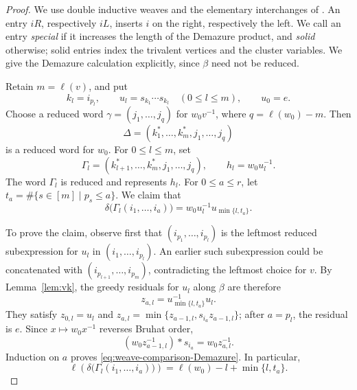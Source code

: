 \documentclass[12pt, reqno]{amsart}
\theoremstyle{plain}
\theoremstyle{definition}
\numberwithin{equation}{section}
\begin{document}
\begin{proof}
We use double inductive weaves and the elementary interchanges of
\cite[Section~6.4]{casals2025cluster}. An entry \(iR\), respectively
\(iL\), inserts \(i\) on the right, respectively the left. We call
an entry \emph{special} if it increases the length of the Demazure
product, and \emph{solid} otherwise; solid entries index the
trivalent vertices and the cluster variables. We give the Demazure
calculation explicitly, since \(\beta\) need not be reduced.

Retain \(m=\ell(v)\), and put
\[
k_l=i_{p_l},\qquad
u_l=s_{k_1}\cdots s_{k_l}\quad(0\leq l\leq m),\qquad u_0=e.
\]
Choose a reduced word \(\gamma=(j_1,\ldots,j_q)\) for
\(w_0v^{-1}\), where \(q=\ell(w_0)-m\). Then
\[
\Delta=(k_1^*,\ldots,k_m^*,j_1,\ldots,j_q)
\]
is a reduced word for \(w_0\). For \(0\leq l\leq m\), set
\[
\Gamma_l=(k_{l+1}^*,\ldots,k_m^*,j_1,\ldots,j_q),\qquad
h_l=w_0u_l^{-1}.
\]
The word \(\Gamma_l\) is reduced and represents \(h_l\).
For \(0\leq a\leq r\), let
\(t_a=\#\{s\in[m]\mid p_s\leq a\}\).
We claim that
\begin{equation}\label{eq:weave-comparison-Demazure}
\delta\bigl(\Gamma_l(i_1,\ldots,i_a)\bigr)
=w_0u_l^{-1}u_{\min\{l,t_a\}}.
\end{equation}

To prove the claim, observe first that
\((i_{p_1},\ldots,i_{p_l})\) is the leftmost reduced
subexpression for \(u_l\) in \((i_1,\ldots,i_{p_l})\).
An earlier such subexpression could be concatenated with
\((i_{p_{l+1}},\ldots,i_{p_m})\), contradicting the leftmost
choice for \(v\). By Lemma~\ref{lem:vk}, the greedy residuals for
\(u_l\) along \(\beta\) are therefore
\[
z_{a,l}=u_{\min\{l,t_a\}}^{-1}u_l.
\]
They satisfy \(z_{0,l}=u_l\) and
\(z_{a,l}=\min\{z_{a-1,l},s_{i_a}z_{a-1,l}\}\);
after \(a=p_l\), the residual is \(e\).
Since \(x\mapsto w_0x^{-1}\) reverses Bruhat order,
\[
(w_0z_{a-1,l}^{-1})* s_{i_a}=w_0z_{a,l}^{-1}.
\]
Induction on \(a\) proves
\eqref{eq:weave-comparison-Demazure}. In particular,
\begin{equation}\label{eq:weave-comparison-length}
\ell\!\left(\delta\bigl(\Gamma_l(i_1,\ldots,i_a)\bigr)\right)
=\ell(w_0)-l+\min\{l,t_a\}.
\end{equation}


\end{proof}
\end{document}
